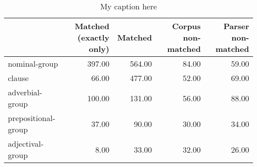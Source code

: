 \begin{table}[!ht]
\centering
\begin{tabular}{lrrrr}
\toprule
{} &  Matched (exactly only) &  Matched &  Corpus non-matched &  Parser non-matched \\
\midrule
nominal-group       &                  397.00 &   564.00 &               84.00 &               59.00 \\
clause              &                   66.00 &   477.00 &               52.00 &               69.00 \\
adverbial-group     &                  100.00 &   131.00 &               56.00 &               88.00 \\
prepositional-group &                   37.00 &    90.00 &               30.00 &               34.00 \\
adjectival-group    &                    8.00 &    33.00 &               32.00 &               26.00 \\
\bottomrule
\end{tabular}
\caption{My caption here}
\label{tab:unit-types-data}
\end{table}